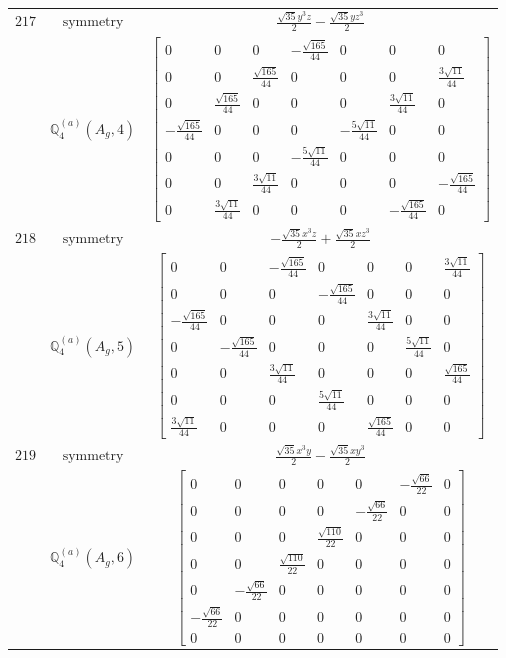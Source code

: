 \documentclass[fleqn,8pt,landscape]{jsarticle}
\begin{document}
\begin{longtable}{ccc}
$ 217 $ & $ \text{symmetry} $ & $ \frac{\sqrt{35} y^{3} z}{2} - \frac{\sqrt{35} y z^{3}}{2} $ \\
$  $ & $ \mathbb{Q}_{4}^{(a)}(A_{g},4) $ & $ \begin{bmatrix} 0 & 0 & 0 & - \frac{\sqrt{165}}{44} & 0 & 0 & 0 \\ 0 & 0 & \frac{\sqrt{165}}{44} & 0 & 0 & 0 & \frac{3 \sqrt{11}}{44} \\ 0 & \frac{\sqrt{165}}{44} & 0 & 0 & 0 & \frac{3 \sqrt{11}}{44} & 0 \\ - \frac{\sqrt{165}}{44} & 0 & 0 & 0 & - \frac{5 \sqrt{11}}{44} & 0 & 0 \\ 0 & 0 & 0 & - \frac{5 \sqrt{11}}{44} & 0 & 0 & 0 \\ 0 & 0 & \frac{3 \sqrt{11}}{44} & 0 & 0 & 0 & - \frac{\sqrt{165}}{44} \\ 0 & \frac{3 \sqrt{11}}{44} & 0 & 0 & 0 & - \frac{\sqrt{165}}{44} & 0 \end{bmatrix} $ \\ \hline
$ 218 $ & $ \text{symmetry} $ & $ - \frac{\sqrt{35} x^{3} z}{2} + \frac{\sqrt{35} x z^{3}}{2} $ \\
$  $ & $ \mathbb{Q}_{4}^{(a)}(A_{g},5) $ & $ \begin{bmatrix} 0 & 0 & - \frac{\sqrt{165}}{44} & 0 & 0 & 0 & \frac{3 \sqrt{11}}{44} \\ 0 & 0 & 0 & - \frac{\sqrt{165}}{44} & 0 & 0 & 0 \\ - \frac{\sqrt{165}}{44} & 0 & 0 & 0 & \frac{3 \sqrt{11}}{44} & 0 & 0 \\ 0 & - \frac{\sqrt{165}}{44} & 0 & 0 & 0 & \frac{5 \sqrt{11}}{44} & 0 \\ 0 & 0 & \frac{3 \sqrt{11}}{44} & 0 & 0 & 0 & \frac{\sqrt{165}}{44} \\ 0 & 0 & 0 & \frac{5 \sqrt{11}}{44} & 0 & 0 & 0 \\ \frac{3 \sqrt{11}}{44} & 0 & 0 & 0 & \frac{\sqrt{165}}{44} & 0 & 0 \end{bmatrix} $ \\ \hline
$ 219 $ & $ \text{symmetry} $ & $ \frac{\sqrt{35} x^{3} y}{2} - \frac{\sqrt{35} x y^{3}}{2} $ \\
$  $ & $ \mathbb{Q}_{4}^{(a)}(A_{g},6) $ & $ \begin{bmatrix} 0 & 0 & 0 & 0 & 0 & - \frac{\sqrt{66}}{22} & 0 \\ 0 & 0 & 0 & 0 & - \frac{\sqrt{66}}{22} & 0 & 0 \\ 0 & 0 & 0 & \frac{\sqrt{110}}{22} & 0 & 0 & 0 \\ 0 & 0 & \frac{\sqrt{110}}{22} & 0 & 0 & 0 & 0 \\ 0 & - \frac{\sqrt{66}}{22} & 0 & 0 & 0 & 0 & 0 \\ - \frac{\sqrt{66}}{22} & 0 & 0 & 0 & 0 & 0 & 0 \\ 0 & 0 & 0 & 0 & 0 & 0 & 0 \end{bmatrix} $ \\ \hline

\end{longtable}
\end{document}
